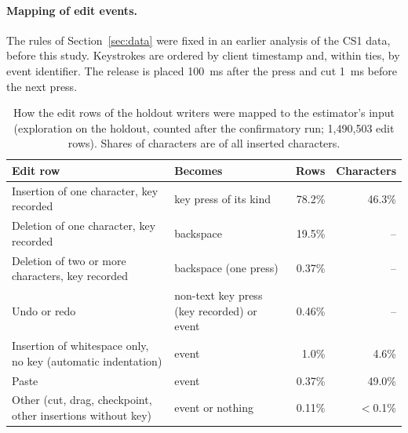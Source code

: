 \paragraph{Mapping of edit events.} The rules of Section~\ref{sec:data} were fixed in an earlier analysis of the CS1
data, before this study. Keystrokes are ordered by client timestamp and, within ties, by event identifier. The release is
placed 100~ms after the press and cut 1~ms before the next press.

\begin{table}[h]
  \caption{How the edit rows of the holdout writers were mapped to the estimator's input (exploration on the holdout,
  counted after the confirmatory run; 1,490,503 edit rows). Shares of characters are of all inserted characters.}
  \label{tab:mapping}
  \centering\small
  \begin{tabularx}{\linewidth}{>{\raggedright\arraybackslash}X >{\raggedright\arraybackslash}p{2.9cm} r r}
    \toprule
    Edit row & Becomes & Rows & Characters \\
    \midrule
    Insertion of one character, key recorded & key press of its kind & 78.2\% & 46.3\% \\
    Deletion of one character, key recorded & backspace & 19.5\% & -- \\
    Deletion of two or more characters, key recorded & backspace (one press) & 0.37\% & -- \\
    Undo or redo & non-text key press (key recorded) or event & 0.46\% & -- \\
    Insertion of whitespace only, no key (automatic indentation) & event & 1.0\% & 4.6\% \\
    Paste & event & 0.37\% & 49.0\% \\
    Other (cut, drag, checkpoint, other insertions without key) & event or nothing & 0.11\% & $<$0.1\% \\
    \bottomrule
  \end{tabularx}
\end{table}

